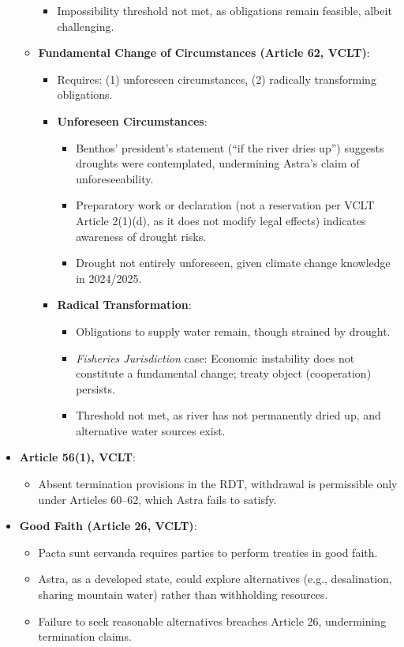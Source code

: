 \begin{itemize}
\begin{itemize}
\begin{itemize}
            \item Impossibility threshold not met, as obligations remain feasible, albeit challenging.
        \end{itemize}
        \item \textbf{Fundamental Change of Circumstances (Article 62, VCLT)}:
        \begin{itemize}
            \item Requires: (1) unforeseen circumstances, (2) radically transforming obligations.
            \item \textbf{Unforeseen Circumstances}:
            \begin{itemize}
                \item Benthos’ president’s statement (“if the river dries up”) suggests droughts were contemplated, undermining Astra’s claim of unforeseeability.
                \item Preparatory work or declaration (not a reservation per VCLT Article 2(1)(d), as it does not modify legal effects) indicates awareness of drought risks.
                \item Drought not entirely unforeseen, given climate change knowledge in 2024/2025.
            \end{itemize}
            \item \textbf{Radical Transformation}:
            \begin{itemize}
                \item Obligations to supply water remain, though strained by drought.
                \item \textit{Fisheries Jurisdiction} case: Economic instability does not constitute a fundamental change; treaty object (cooperation) persists.
                \item Threshold not met, as river has not permanently dried up, and alternative water sources exist.
            \end{itemize}
        \end{itemize}
    \end{itemize}
    \item \textbf{Article 56(1), VCLT}:
    \begin{itemize}
        \item Absent termination provisions in the RDT, withdrawal is permissible only under Articles 60–62, which Astra fails to satisfy.
    \end{itemize}
    \item \textbf{Good Faith (Article 26, VCLT)}:
    \begin{itemize}
        \item Pacta sunt servanda requires parties to perform treaties in good faith.
        \item Astra, as a developed state, could explore alternatives (e.g., desalination, sharing mountain water) rather than withholding resources.
        \item Failure to seek reasonable alternatives breaches Article 26, undermining termination claims.
    \end{itemize}
\end{itemize}

